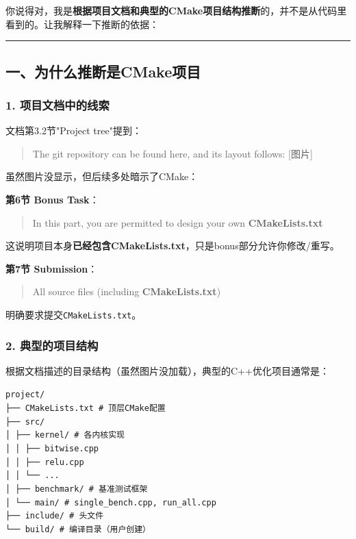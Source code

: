 \documentclass[11pt, a4paper]{article}
\begin{document}
\begin{aibox}
你说得对，我是\textbf{根据项目文档和典型的CMake项目结构推断}的，并不是从代码里看到的。让我解释一下推断的依据：

\begin{center}\rule{\textwidth}{0.4pt}\end{center}

\subsection*{一、为什么推断是CMake项目}

\subsubsection*{1. 项目文档中的线索}

文档第3.2节"Project tree"提到：
\begin{quote}
The git repository can be found here, and its layout follows: [图片]
\end{quote}
虽然图片没显示，但后续多处暗示了CMake：

\textbf{第6节 Bonus Task}：
\begin{quote}
In this part, you are permitted to design your own \textbf{CMakeLists.txt}
\end{quote}
这说明项目本身\textbf{已经包含CMakeLists.txt}，只是bonus部分允许你修改/重写。

\textbf{第7节 Submission}：
\begin{quote}
All source files (including \textbf{CMakeLists.txt})
\end{quote}
明确要求提交\texttt{CMakeLists.txt}。

\subsubsection*{2. 典型的项目结构}

根据文档描述的目录结构（虽然图片没加载），典型的C++优化项目通常是：

\begin{tcolorbox}[colback=white,colframe=gray!50!white,boxrule=0.5pt,arc=2pt,left=5pt,right=5pt,top=5pt,bottom=5pt]
\texttt{project/}\\
\texttt{├── CMakeLists.txt          \# 顶层CMake配置}\\
\texttt{├── src/}\\
\texttt{│   ├── kernel/            \# 各内核实现}\\
\texttt{│   │   ├── bitwise.cpp}\\
\texttt{│   │   ├── relu.cpp}\\
\texttt{│   │   └── ...}\\
\texttt{│   ├── benchmark/         \# 基准测试框架}\\
\texttt{│   └── main/              \# single\_bench.cpp, run\_all.cpp}\\
\texttt{├── include/               \# 头文件}\\
\texttt{└── build/                 \# 编译目录（用户创建）}
\end{tcolorbox}


\end{aibox}
\end{document}
